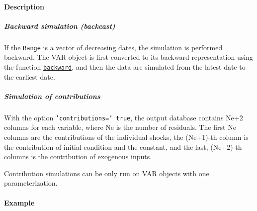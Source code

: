 \paragraph{Description}\label{description}

\subparagraph{Backward simulation
(backcast)}\label{backward-simulation-backcast}

If the \texttt{Range} is a vector of decreasing dates, the simulation is
performed backward. The VAR object is first converted to its backward
representation using the function
\href{VAR/backward}{\texttt{backward}}, and then the data are simulated
from the latest date to the earliest date.

\subparagraph{Simulation of
contributions}\label{simulation-of-contributions}

With the option \texttt{'contributions=' true}, the output database
contains Ne+2 columns for each variable, where Ne is the number of
residuals. The first Ne columns are the contributions of the individual
shocks, the (Ne+1)-th column is the contribution of initial condition
and the constant, and the last, (Ne+2)-th columns is the contribution of
exogenous inputs.

Contribution simulations can be only run on VAR objects with one
parameterization.

\paragraph{Example}\label{example}


